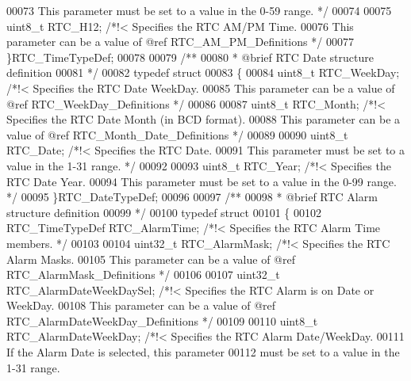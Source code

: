 \begin{DoxyCode}
00073 \textcolor{comment}{                        This parameter must be set to a value in the 0-59 range. */}
00074 
00075   uint8\_t RTC_H12;      \textcolor{comment}{/*!< Specifies the RTC AM/PM Time.}
00076 \textcolor{comment}{                        This parameter can be a value of @ref RTC\_AM\_PM\_Definitions */}
00077 \}RTC\_TimeTypeDef;
00078 
00079 \textcolor{comment}{/** }
00080 \textcolor{comment}{  * @brief  RTC Date structure definition  }
00081 \textcolor{comment}{  */}
00082 \textcolor{keyword}{typedef} \textcolor{keyword}{struct}
00083 \{
00084   uint8\_t RTC_WeekDay; \textcolor{comment}{/*!< Specifies the RTC Date WeekDay.}
00085 \textcolor{comment}{                        This parameter can be a value of @ref RTC\_WeekDay\_Definitions */}
00086 
00087   uint8\_t RTC_Month;   \textcolor{comment}{/*!< Specifies the RTC Date Month (in BCD format).}
00088 \textcolor{comment}{                        This parameter can be a value of @ref RTC\_Month\_Date\_Definitions */}
00089 
00090   uint8\_t RTC_Date;     \textcolor{comment}{/*!< Specifies the RTC Date.}
00091 \textcolor{comment}{                        This parameter must be set to a value in the 1-31 range. */}
00092 
00093   uint8\_t RTC_Year;     \textcolor{comment}{/*!< Specifies the RTC Date Year.}
00094 \textcolor{comment}{                        This parameter must be set to a value in the 0-99 range. */}
00095 \}RTC\_DateTypeDef;
00096 
00097 \textcolor{comment}{/** }
00098 \textcolor{comment}{  * @brief  RTC Alarm structure definition  }
00099 \textcolor{comment}{  */}
00100 \textcolor{keyword}{typedef} \textcolor{keyword}{struct}
00101 \{
00102   RTC\_TimeTypeDef RTC_AlarmTime;     \textcolor{comment}{/*!< Specifies the RTC Alarm Time members. */}
00103 
00104   uint32\_t RTC_AlarmMask;            \textcolor{comment}{/*!< Specifies the RTC Alarm Masks.}
00105 \textcolor{comment}{                                     This parameter can be a value of @ref RTC\_AlarmMask\_Definitions
       */}
00106 
00107   uint32\_t RTC_AlarmDateWeekDaySel;  \textcolor{comment}{/*!< Specifies the RTC Alarm is on Date or WeekDay.}
00108 \textcolor{comment}{                                     This parameter can be a value of @ref
       RTC\_AlarmDateWeekDay\_Definitions */}
00109 
00110   uint8\_t RTC_AlarmDateWeekDay;      \textcolor{comment}{/*!< Specifies the RTC Alarm Date/WeekDay.}
00111 \textcolor{comment}{                                     If the Alarm Date is selected, this parameter}
00112 \textcolor{comment}{                                     must be set to a value in the 1-31 range.}

\end{DoxyCode}
